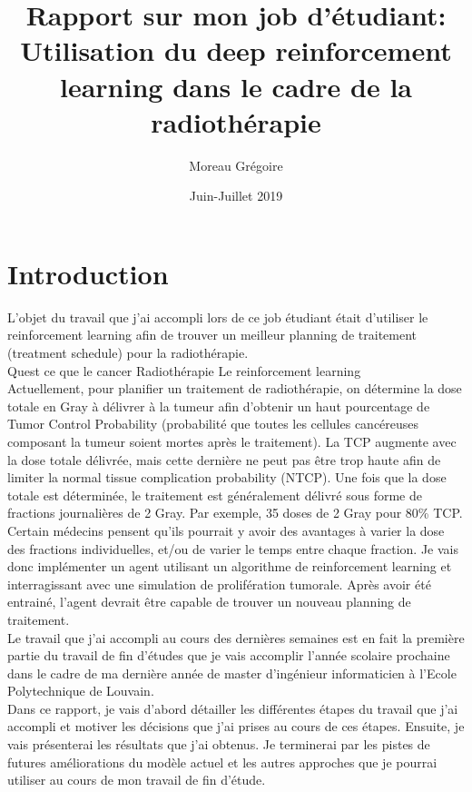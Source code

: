 \documentclass[12pt]{article}
\title{Rapport sur mon job d'étudiant:\\
Utilisation du deep reinforcement learning dans le cadre de la radiothérapie}
\author{Moreau Grégoire}
\date{Juin-Juillet 2019}
\begin{document}
\maketitle

\section{Introduction}
L'objet du travail que j'ai accompli lors de ce job étudiant était d'utiliser le reinforcement learning afin de trouver un meilleur planning de traitement (treatment schedule) pour la radiothérapie.\\
Quest ce que le cancer
Radiothérapie
Le reinforcement learning\\

Actuellement, pour planifier un traitement de radiothérapie, on détermine la dose totale en Gray à délivrer à la tumeur afin d'obtenir un haut pourcentage de Tumor Control Probability (probabilité que toutes les cellules cancéreuses composant la tumeur soient mortes après le traitement). La TCP augmente avec la dose totale délivrée, mais cette dernière ne peut pas être trop haute afin de limiter la normal tissue complication probability (NTCP).
Une fois que la dose totale est déterminée, le traitement est généralement délivré sous forme de fractions journalières de 2 Gray. Par exemple, 35 doses de 2 Gray pour 80\% TCP. Certain médecins pensent qu'ils pourrait y avoir des avantages à varier la dose des fractions individuelles, et/ou de varier le temps entre chaque fraction. Je vais donc implémenter un agent utilisant un algorithme de reinforcement learning et interragissant avec une simulation de prolifération tumorale. Après avoir été entrainé, l'agent devrait être capable de trouver un nouveau planning de traitement.\\

Le travail que j'ai accompli au cours des dernières semaines est en fait la première partie du travail de fin d'études que je vais accomplir l'année scolaire prochaine dans le cadre de ma dernière année de master d'ingénieur informaticien à l'Ecole Polytechnique de Louvain.\\
Dans ce rapport, je vais d'abord détailler les différentes étapes du travail que j'ai accompli et motiver les décisions que j'ai prises au cours de ces étapes. Ensuite, je vais présenterai les résultats que j'ai obtenus. Je terminerai par les pistes de futures améliorations du modèle actuel et les autres approches que je pourrai utiliser au cours de mon travail de fin d'étude.\\
\end{document}
